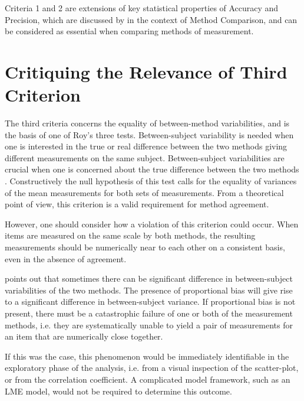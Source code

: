 \documentclass[12pt, a4paper]{report}
\theoremstyle{plain}
\theoremstyle{definition}
\theoremstyle{remark}
\begin{document}
Criteria 1 and 2 are extensions of key statistical properties of Accuracy and Precision, which are discussed by \citet{Barnhart} 
in the context of Method Comparison, and can be considered as essential when comparing methods of measurement. 

%

\section{Critiquing the Relevance of Third Criterion}

The third criteria concerns the equality of between-method variabilities, and 
is the basis of one of Roy's three tests. Between-subject variability is
needed when one is interested in the true or real difference between the two methods giving different measurements on the same subject. Between-subject variabilities are crucial when one is concerned about the true difference between the two methods \citep{ARoy2009}. Constructively the null hypothesis of this test calls for the equality of variances of the mean measurements 
for both sets of measurements. From a theoretical point of view, this criterion is a valid requirement for method agreement. 

However, one should consider how a violation of this criterion could occur. When items are measured on the same scale by both methods, the resulting measurements should be numerically near to each other on a consistent basis, even in the absence of agreement. 

\citet{ARoy2009} points out that sometimes there
can be significant difference in between-subject variabilities of the two methods. The presence of proportional bias will give rise to a significant difference in between-subject variance. If proportional bias is not present, there must be a catastrophic failure of one or both of the measurement methods, i.e. they are systematically unable to yield a pair of measurements for an item that are numerically close together.

If this was the case, this phenomenon would be immediately identifiable in the exploratory phase of the analysis, i.e. from a visual inspection of the scatter-plot, or from the correlation coefficient. A complicated model framework, such as an LME model, would not be required to determine this outcome.
\end{document}
